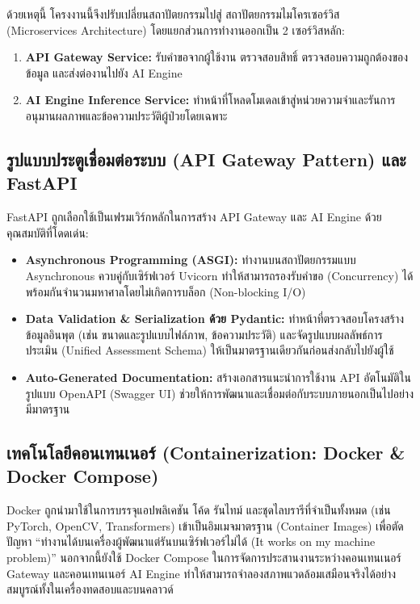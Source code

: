 ด้วยเหตุนี้ โครงงานนี้จึงปรับเปลี่ยนสถาปัตยกรรมไปสู่ สถาปัตยกรรมไมโครเซอร์วิส (Microservices Architecture) โดยแยกส่วนการทำงานออกเป็น 2 เซอร์วิสหลัก:
\begin{enumerate}
    \item \textbf{API Gateway Service:} รับคำขอจากผู้ใช้งาน ตรวจสอบสิทธิ์ ตรวจสอบความถูกต้องของข้อมูล และส่งต่องานไปยัง AI Engine
    \item \textbf{AI Engine Inference Service:} ทำหน้าที่โหลดโมเดลเข้าสู่หน่วยความจำและรันการอนุมานผลภาพและข้อความประวัติผู้ป่วยโดยเฉพาะ
\end{enumerate}

\subsection{รูปแบบประตูเชื่อมต่อระบบ (API Gateway Pattern) และ FastAPI}
FastAPI ถูกเลือกใช้เป็นเฟรมเวิร์กหลักในการสร้าง API Gateway และ AI Engine ด้วยคุณสมบัติที่โดดเด่น:
\begin{itemize}
    \item \textbf{Asynchronous Programming (ASGI):} ทำงานบนสถาปัตยกรรมแบบ Asynchronous ควบคู่กับเซิร์ฟเวอร์ Uvicorn ทำให้สามารถรองรับคำขอ (Concurrency) ได้พร้อมกันจำนวนมหาศาลโดยไม่เกิดการบล็อก (Non-blocking I/O)
    \item \textbf{Data Validation \& Serialization ด้วย Pydantic:} ทำหน้าที่ตรวจสอบโครงสร้างข้อมูลอินพุต (เช่น ขนาดและรูปแบบไฟล์ภาพ, ข้อความประวัติ) และจัดรูปแบบผลลัพธ์การประเมิน (Unified Assessment Schema) ให้เป็นมาตรฐานเดียวกันก่อนส่งกลับไปยังผู้ใช้
    \item \textbf{Auto-Generated Documentation:} สร้างเอกสารแนะนำการใช้งาน API อัตโนมัติในรูปแบบ OpenAPI (Swagger UI) ช่วยให้การพัฒนาและเชื่อมต่อกับระบบภายนอกเป็นไปอย่างมีมาตรฐาน
\end{itemize}

\subsection{เทคโนโลยีคอนเทนเนอร์ (Containerization: Docker \& Docker Compose)}
Docker ถูกนำมาใช้ในการบรรจุแอปพลิเคชัน โค้ด รันไทม์ และชุดไลบรารีที่จำเป็นทั้งหมด (เช่น PyTorch, OpenCV, Transformers) เข้าเป็นอิมเมจมาตรฐาน (Container Images) เพื่อตัดปัญหา ``ทำงานได้บนเครื่องผู้พัฒนาแต่รันบนเซิร์ฟเวอร์ไม่ได้ (It works on my machine problem)'' นอกจากนี้ยังใช้ Docker Compose ในการจัดการประสานงานระหว่างคอนเทนเนอร์ Gateway และคอนเทนเนอร์ AI Engine ทำให้สามารถจำลองสภาพแวดล้อมเสมือนจริงได้อย่างสมบูรณ์ทั้งในเครื่องทดสอบและบนคลาวด์



